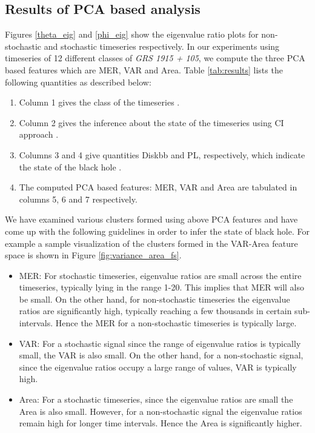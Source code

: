 \documentclass[10pt,conference]{IEEEtran}
\begin{document}
\subsection{Results of PCA based analysis}

Figures \ref{theta_eig}  and \ref{phi_eig} show the eigenvalue ratio plots for non-stochastic and stochastic timeseries respectively. In our experiments using timeseries of 12 different classes of \textit{GRS 1915 + 105}, we compute the three PCA based features which are MER, VAR and Area. Table \ref{tab:results} lists the following quantities as described below:

\begin{enumerate}
  \item Column 1 gives the class of the timeseries \cite{Adegoke2018}.
  \item Column 2 gives the inference about the state of the timeseries using CI approach \cite{Adegoke2018}.
  \item Columns 3 and 4 give quantities Diskbb and  PL, respectively, which indicate the state of the black hole \cite{Adegoke2018}.
  \item The computed PCA based features: MER, VAR and Area  are tabulated in columns 5, 6 and 7 respectively.
\end{enumerate}

We have examined various clusters formed using above PCA features and have come up with the following guidelines in order to infer the state of black hole. For example a sample visualization of the clusters formed in the VAR-Area feature space is shown in Figure \ref{fig:variance_area_fs}.

\begin{itemize}
  \item MER: For stochastic timeseries, eigenvalue ratios  are small across the entire timeseries, typically lying in the range 1-20. This implies that MER  will also be small. On the other hand, for  non-stochastic timeseries the eigenvalue ratios are significantly high, typically reaching a few thousands in certain sub-intervals. Hence the MER for a non-stochastic timeseries is typically large.
  \item VAR: For a stochastic signal since the range of eigenvalue ratios is typically small, the VAR is also small. On the other hand, for a non-stochastic signal, since the eigenvalue ratios occupy a large range of values, VAR is typically high.
  \item Area: For a stochastic timeseries, since the eigenvalue ratios  are small the Area is also small. However, for a non-stochastic signal the eigenvalue ratios remain high for longer time intervals. Hence the Area is significantly higher.
\end{itemize}
\end{document}
